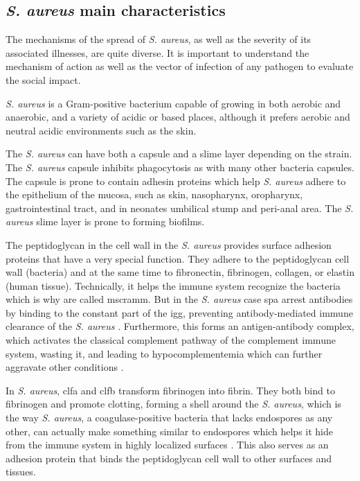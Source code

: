 \subsection{\textit{S. aureus} main characteristics}

The mechanisms of the spread of \textit{S. aureus}, as well as the severity of its associated illnesses, are quite diverse. It is important to understand the mechanism of action as well as the vector of infection of any pathogen to evaluate the social impact.

\textit{S. aureus} is a Gram-positive bacterium capable of growing in both aerobic and anaerobic, and a variety of acidic or based places, although it prefers aerobic and neutral acidic environments such as the skin.

The \textit{S. aureus} can have both a capsule and a slime layer depending on the strain. The \textit{S. aureus} capsule inhibits phagocytosis as with many other bacteria capsules. The capsule is prone to contain adhesin proteins which help \textit{S. aureus} adhere to the epithelium of the mucosa, such as skin, nasopharynx, oropharynx, gastrointestinal tract, and in neonates umbilical stump and peri-anal area. The \textit{S. aureus} slime layer is prone to forming biofilms. \cite{Parastan2020}

The peptidoglycan in the cell wall in the \textit{S. aureus} provides surface adhesion proteins that have a very special function. They adhere to the peptidoglycan cell wall (bacteria) and at the same time to fibronectin, fibrinogen, collagen, or elastin (human tissue). Technically, it helps the immune system recognize the bacteria which is why are called \gls{mscramm}. But in the \textit{S. aureus} case \gls{spa} arrest antibodies by binding to the constant part of the \gls{igg}, preventing antibody-mediated immune clearance of the \textit{S. aureus} \cite{Radke2018}. Furthermore, this forms an antigen-antibody complex, which activates the classical complement pathway of the complement immune system, wasting it, and leading to hypocomplementemia which can further aggravate other conditions \cite{Ali2022}.

In \textit{S. aureus}, \gls{clfa} and \gls{clfb} transform fibrinogen into fibrin. They both bind to fibrinogen and promote clotting, forming a shell around the \textit{S. aureus}, which is the way \textit{S. aureus}, a coagulase-positive bacteria that lacks endospores as any other, can actually make something similar to endospores which helps it hide from the immune system in highly localized surfaces \cite{Lacey2019}. This also serves as an adhesion protein that binds the peptidoglycan cell wall to other surfaces and tissues.

